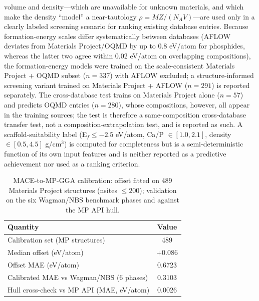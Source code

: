 \documentclass[11pt,a4paper]{article}
\begin{document}
volume and density---which are unavailable for unknown materials, and which make the density ``model'' a near-tautology $\rho = MZ/(N_A V)$---are used only in a clearly labeled screening scenario for ranking existing database entries. Because formation-energy scales differ systematically between databases (AFLOW deviates from Materials Project/OQMD by up to 0.8 eV/atom for phosphides, whereas the latter two agree within 0.02 eV/atom on overlapping compositions), the formation-energy models were trained on the scale-consistent Materials Project + OQMD subset ($n=337$) with AFLOW excluded; a structure-informed screening variant trained on Materials Project + AFLOW ($n=291$) is reported separately. The cross-database test trains on Materials Project alone ($n=57$) and predicts OQMD entries ($n=280$), whose compositions, however, all appear in the training sources; the test is therefore a same-composition cross-database transfer test, not a composition-extrapolation test, and is reported as such. A scaffold-suitability label (E$_f \leq -2.5$ eV/atom, Ca/P $\in [1.0, 2.1]$, density $\in [0.5, 4.5]$ g/cm$^3$) is computed for completeness but is a semi-deterministic function of its own input features and is neither reported as a predictive achievement nor used as a ranking criterion.

\begin{table}[ht]
\centering\small
\caption{MACE-to-MP-GGA calibration: offset fitted on 489 Materials Project structures (nsites $\leq 200$); validation on the six Wagman/NBS benchmark phases and against the MP API hull.}
\label{tab:kalibrasi}
\begin{tabular}{lc}
\toprule
Quantity & Value \\
\midrule
Calibration set (MP structures) & 489 \\
Median offset (eV/atom) & +0.086 \\
Offset MAE (eV/atom) & 0.6723 \\
Calibrated MAE vs Wagman/NBS (6 phases) & 0.3103 \\
Hull cross-check vs MP API (MAE, eV/atom) & 0.0026 \\
\bottomrule
\end{tabular}
\end{table}
\end{document}
